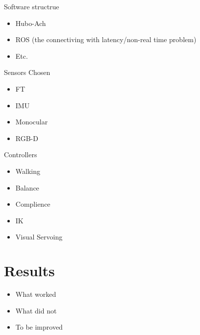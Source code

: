 Software structrue
\begin{itemize}
\item Hubo-Ach
\item ROS (the connectiving with latency/non-real time problem)

\item Etc.
\end{itemize}


Sensors Chosen
\begin{itemize}
\item FT
\item IMU
\item Monocular
\item RGB-D
\end{itemize}

Controllers
\begin{itemize}
\item Walking
\item Balance
\item Complience
\item IK
\item Visual Servoing
\end{itemize}

\section{Results}\label{sec:results}
\begin{itemize}
\item What worked
\item What did not
\item To be improved
\end{itemize}
